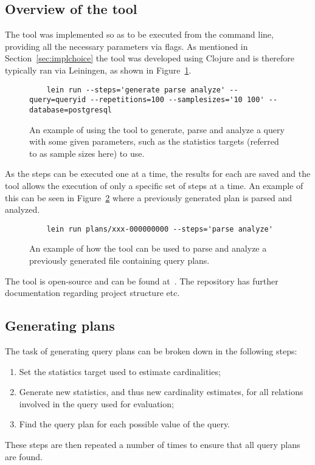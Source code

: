 \subsection{Overview of the tool}
The tool was implemented so as to be executed from the command line, providing
all the necessary parameters via flags. As mentioned in
Section~\ref{sec:implchoice} the tool was developed using Clojure and is
therefore typically ran via Leiningen, as shown in
Figure~\ref{fig:cmd:runtool1}.

\begin{figure}[ht]
  \begin{verbatim}
    lein run --steps='generate parse analyze' --query=queryid --repetitions=100 --samplesizes='10 100' --database=postgresql
  \end{verbatim}
  \caption[Using the tool to generate, parse and analyze a query]{An example of
    using the tool to generate, parse and analyze a query with some given
    parameters, such as the statistics targets (referred to as sample sizes here)
    to use.}\label{fig:cmd:runtool1}
\end{figure}

As the steps can be executed one at a time, the results for each are saved and
the tool allows the execution of only a specific set of steps at a time. An
example of this can be seen in Figure~\ref{fig:cmd:runtool2} where a previously
generated plan is parsed and analyzed.

\begin{figure}[ht]
  \begin{verbatim}
    lein run plans/xxx-000000000 --steps='parse analyze'
  \end{verbatim}
  \caption[Using the tool to parse and analyze a previously generated plan]{An
    example of how the tool can be used to parse and analyze a previously
    generated file containing query plans.}\label{fig:cmd:runtool2}
\end{figure}

The tool is open-source and can be found at~\cite{barksten_mbark_m}. The
repository has further documentation regarding project structure etc.

\subsection{Generating plans}\label{sec:generatingplans}
The task of generating query plans can be broken down in the following steps:
\begin{enumerate}
\item Set the statistics target used to estimate cardinalities;
\item Generate new statistics, and thus new cardinality estimates, for all
  relations involved in the query used for evaluation;
\item Find the query plan for each possible value of the query.
\end{enumerate}
These steps are then repeated a number of times to ensure that all query plans
are found.

